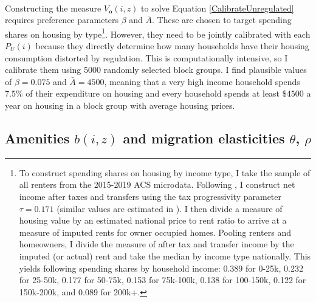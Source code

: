 \documentclass[12pt]{article}
\begin{document}
\paragraph*{}
Constructing the measure $V_{\boldsymbol{o}}(i, z)$ to solve Equation \eqref{CalibrateUnregulated} requires preference parameters $\beta$ and $\bar{A}$. These are chosen to target spending shares on housing by type\footnote{To construct spending shares on housing by income type, I take the sample of all renters from the 2015-2019 ACS microdata. Following \cite{FinlayWilliams}, I construct net income after taxes and transfers using the tax progressivity parameter $\tau = 0.171$ (similar values are estimated in \cite{heathcoteetal}). I then divide a measure of housing value by an estimated national price to rent ratio to arrive at a measure of imputed rents for owner occupied homes. Pooling renters and homeowners, I divide the measure of after tax and transfer income by the imputed (or actual) rent and take the median by income type nationally. This yields following spending shares by household income: 0.389 for 0-25k, 0.232 for 25-50k, 0.177 for 50-75k, 0.153 for 75k-100k, 0.138 for 100-150k, 0.122 for 150k-200k, and 0.089 for 200k+.}. However, they need to be jointly calibrated with each $P_{U}(i)$ because they directly determine how many households have their housing consumption distorted by regulation. This is computationally intensive, so I calibrate them using 5000 randomly selected block groups. I find plausible values of $\beta = 0.075$ and $\bar{A} = 4500$, meaning that a very high income household spends $7.5\%$ of their expenditure on housing and every household spends at least $\$4500$ a year on housing in a block group with average housing prices. 


\subsection{Amenities $b(i, z)$ and migration elasticities $\theta$, $\rho$} 
\end{document}
